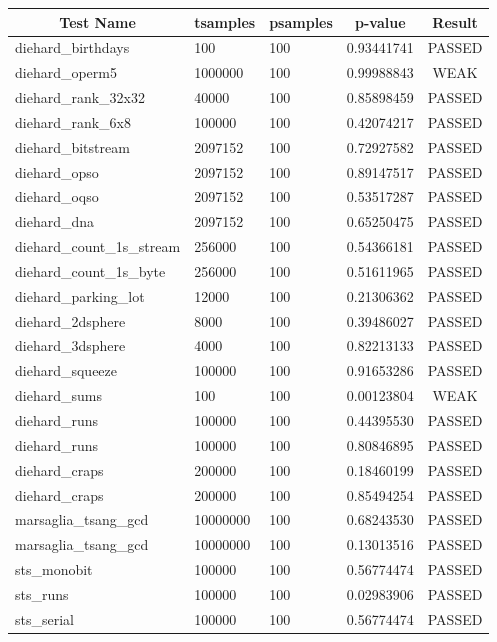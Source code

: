 \documentclass[titlepage, 11pt]{article}
\begin{document}
\begin{table}[!htb]
\begin{tabular}{l|l|l|c|c}
\hline
\multicolumn{1}{c|}{\textbf{Test Name}} & \multicolumn{1}{c|}{\textbf{tsamples}} & \multicolumn{1}{c|}{\textbf{psamples}} & \textbf{p-value} & \textbf{Result} \\ \hline
diehard\_birthdays & 100 & 100 & 0.93441741 & PASSED \\
diehard\_operm5 & 1000000 & 100 & 0.99988843 & WEAK \\
diehard\_rank\_32x32 & 40000 & 100 & 0.85898459 & PASSED \\
diehard\_rank\_6x8 & 100000 & 100 & 0.42074217 & PASSED \\
diehard\_bitstream & 2097152 & 100 & 0.72927582 & PASSED \\
diehard\_opso & 2097152 & 100 & 0.89147517 & PASSED \\
diehard\_oqso & 2097152 & 100 & 0.53517287 & PASSED \\
diehard\_dna & 2097152 & 100 & 0.65250475 & PASSED \\
diehard\_count\_1s\_stream & 256000 & 100 & 0.54366181 & PASSED \\
diehard\_count\_1s\_byte & 256000 & 100 & 0.51611965 & PASSED \\
diehard\_parking\_lot & 12000 & 100 & 0.21306362 & PASSED \\
diehard\_2dsphere & 8000 & 100 & 0.39486027 & PASSED \\
diehard\_3dsphere & 4000 & 100 & 0.82213133 & PASSED \\
diehard\_squeeze & 100000 & 100 & 0.91653286 & PASSED \\
diehard\_sums & 100 & 100 & 0.00123804 & WEAK \\
diehard\_runs & 100000 & 100 & 0.44395530 & PASSED \\
diehard\_runs & 100000 & 100 & 0.80846895 & PASSED \\
diehard\_craps & 200000 & 100 & 0.18460199 & PASSED \\
diehard\_craps & 200000 & 100 & 0.85494254 & PASSED \\
marsaglia\_tsang\_gcd & 10000000 & 100 & 0.68243530 & PASSED \\
marsaglia\_tsang\_gcd & 10000000 & 100 & 0.13013516 & PASSED \\
sts\_monobit & 100000 & 100 & 0.56774474 & PASSED \\
sts\_runs & 100000 & 100 & 0.02983906 & PASSED \\
sts\_serial & 100000 & 100 & 0.56774474 & PASSED \\

\end{tabular}
\end{table}
\end{document}
